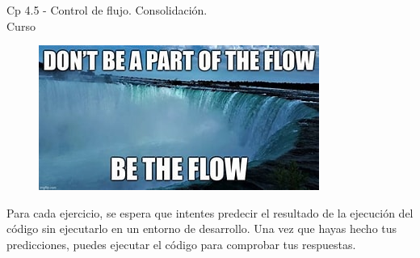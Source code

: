 \begin{center}
    \begin{large}
    Cp 4.5 - Control de flujo. Consolidación.\\
    Curso \academicyear\\
    \end{large}
    \begin{figure}[h]
    	\centering
    	\includegraphics[width=0.5\linewidth]{cp4.5/control_flow.jpg}
    \end{figure}
\end{center}

Para cada ejercicio, se espera que intentes predecir el resultado de la ejecución del código sin ejecutarlo en un entorno de desarrollo. Una vez que hayas hecho tus predicciones, puedes ejecutar el código para comprobar tus respuestas.

